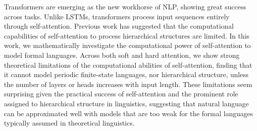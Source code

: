 Transformers are emerging as the new workhorse of NLP, showing great success across tasks. Unlike LSTMs, transformers process input sequences entirely through self-attention. Previous work has suggested that the computational capabilities of self-attention to process hierarchical structures are limited. In this work, we mathematically investigate the computational power of self-attention to model formal languages. Across both soft and hard attention, we show strong theoretical limitations of the computational abilities of self-attention, finding that it cannot model periodic finite-state languages, nor hierarchical structure, unless the number of layers or heads increases with input length. These limitations seem surprising given the practical success of self-attention and the prominent role assigned to hierarchical structure in linguistics, suggesting that natural language can be approximated well with models that are too weak for the formal languages typically assumed in theoretical linguistics.